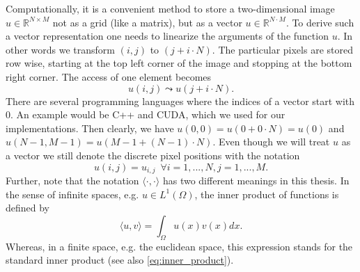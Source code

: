     Computationally, it is a convenient method to store a two-dimensional image $u \in \mathbb{R}^{N \times M}$ not as a grid (like a matrix), but as a vector $u \in \mathbb{R}^{N \cdot M}$. To derive such a vector representation one needs to linearize the arguments of the function $u$. In other words we transform $(i, j)$ to $(j + i \cdot N)$. %
    The particular pixels are stored row wise, starting at the top left corner of the image and stopping at the bottom right corner. The access of one element becomes
        $$
            u(i, j) \leadsto u(j + i \cdot N).
        $$
    There are several programming languages where the indices of a vector start with $0$. An example would be C++ and CUDA, which we used for our implementations. Then clearly, we have $u(0, 0) = u(0 + 0 \cdot N) = u(0)$ and $u(N-1, M-1) = u(M-1 + (N-1) \cdot N)$. Even though we will treat $u$ as a vector we still denote the discrete pixel positions with the notation
        $$
            u(i, j) = u_{i, j} \,\,\, \forall i = 1, ..., N, j = 1, ..., M.
        $$
    Further, note that the notation $\langle \cdot, \cdot \rangle$ has two different meanings in this thesis. In the sense of infinite spaces, e.g. $u \in L^{1}(\Omega)$, the inner product of functions is defined by
        $$
            \langle u, v \rangle = \int_{\Omega} u(x)v(x) dx.
        $$
    Whereas, in a finite space, e.g. the euclidean space, this expression stands for the standard inner product (see also \ref{eq:inner_product}).

